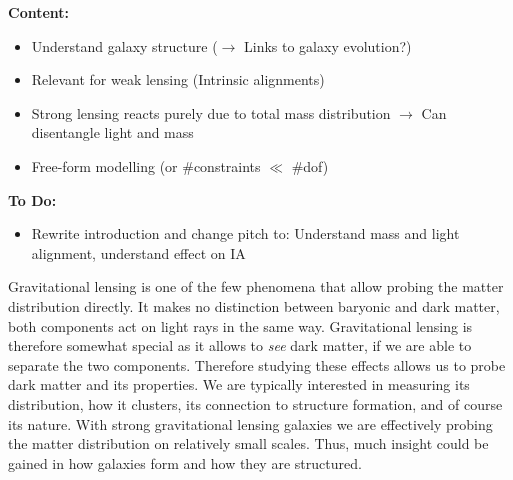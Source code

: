\documentclass[useAMS,usenatbib]{mn2e}
\begin{document}


\textbf{Content:}
\begin{itemize}
\item Understand galaxy structure ($\rightarrow$ Links to galaxy evolution?)
\item Relevant for weak lensing (Intrinsic alignments)
\item Strong lensing reacts purely due to total mass distribution $\rightarrow$ Can disentangle light and mass
\item Free-form modelling (or \#constraints $\ll$ \#dof)
\end{itemize}

\textbf{To Do:}
\begin{itemize}
\item Rewrite introduction and change pitch to: Understand mass and light alignment, understand effect on IA
\end{itemize}

Gravitational lensing is one of the few phenomena that allow probing the matter distribution directly. It makes no distinction between baryonic and dark matter, both components act on light rays in the same way. Gravitational lensing is therefore somewhat special as it allows to \textit{see} dark matter, if we are able to separate the two components. Therefore studying these effects allows us to probe dark matter and its properties. We are typically interested in measuring its distribution, how it clusters, its connection to structure formation, and of course its nature. With strong gravitational lensing galaxies we are effectively probing the matter distribution on relatively small scales. Thus, much insight could be gained in how galaxies form and how they are structured.
\end{document}
